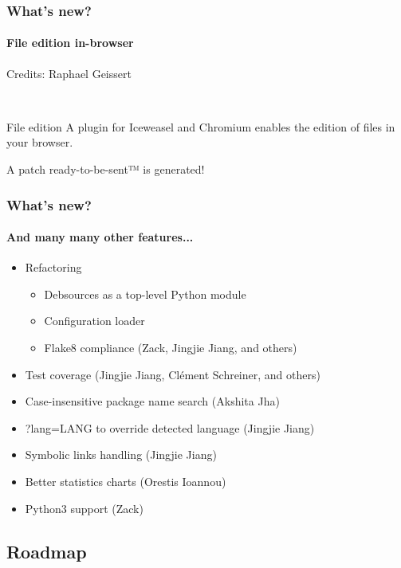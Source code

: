 \documentclass{beamer}
\begin{document}
\begin{frame}
  \frametitle{What's new?}
  \framesubtitle{File edition in-browser}
  Credits: Raphael Geissert
  
  ~\\
  \begin{block}{File edition}
    A plugin for Iceweasel and Chromium enables the edition of files in
    your browser.

    A patch ready-to-be-sent™ is generated!
  \end{block}
\end{frame}

\begin{frame}
  \frametitle{What's new?}
  \framesubtitle{And many many other features...}
  \begin{itemize}
  \item Refactoring
    \pause
    \begin{itemize}
    \item Debsources as a top-level Python module
      \pause
    \item Configuration loader
      \pause
    \item Flake8 compliance (Zack, Jingjie Jiang, and others)
      \pause
    \end{itemize}
  \item Test coverage (Jingjie Jiang, Clément Schreiner, and others)
    \pause
  \item Case-insensitive package name search (Akshita Jha)
    \pause
  \item ?lang=LANG to override detected language (Jingjie Jiang)
    \pause
  \item Symbolic links handling (Jingjie Jiang)
    \pause
  \item Better statistics charts (Orestis Ioannou)
    \pause
  \item Python3 support (Zack)
  \end{itemize}
\end{frame}

\subsection{Roadmap}
\end{document}
